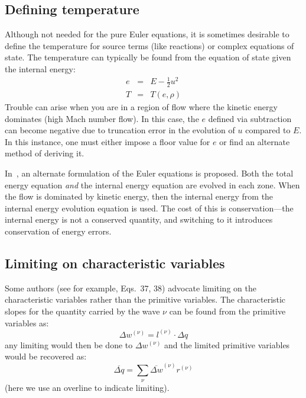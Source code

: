 \subsection{Defining temperature}

  Although not needed for the pure
  Euler equations, it is sometimes desirable to define the temperature
  for source terms (like reactions) or complex equations of state.
  The temperature can typically be found from the equation of state
  given the internal energy:
  \begin{eqnarray}
  e &=& E - \frac{1}{2} u^2 \\
  T &=& T(e, \rho)
  \end{eqnarray}
  Trouble can arise when you are in a region of flow where the kinetic
  energy dominates (high Mach number flow).  In this case, the $e$ defined
  via subtraction can become negative due to truncation error in the
  evolution of $u$ compared to $E$.  In this instance, one must either
  impose a floor value for $e$ or find an alternate method of deriving
  it.

  In~\cite{bryan:1995}, an alternate formulation of the Euler equations
  is proposed.  Both the total energy equation {\em and} the internal
  energy equation are evolved in each zone.  When the flow is dominated
  by kinetic energy, then the internal energy from the internal energy
  evolution equation is used.  The cost of this is conservation---the
  internal energy is not a conserved quantity, and switching to it
  introduces conservation of energy errors.

\subsection{Limiting on characteristic variables}

  Some authors (see for example, \cite{athena} Eqs.~37, 38) advocate
  limiting on the characteristic variables rather than the primitive
  variables.  The characteristic slopes for the quantity carried by
  the wave $\nu$ can be found from the primitive variables
  as: \begin{equation} \Delta w^{(\nu)} = l^{(\nu)} \cdot \Delta
  q \end{equation} any limiting would then be done to $\Delta
  w^{(\nu)}$ and the limited primitive variables would be recovered
  as: \begin{equation} \overline{\Delta q} = \sum_\nu \overline{\Delta
  w}^{(\nu)} r^{(\nu)} \end{equation} (here we use an overline to
  indicate limiting).

